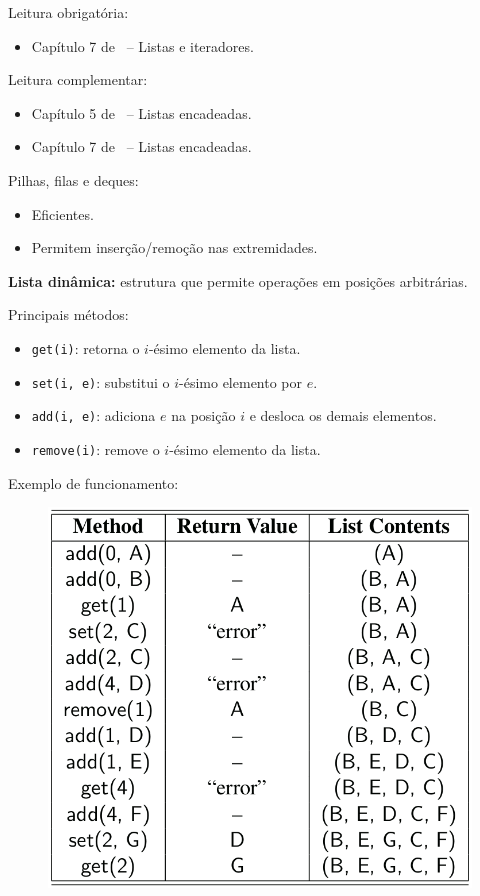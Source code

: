 \newcommand{\defs}{../defs}


\newcommand{\content}{Listas dinâmicas}
\newcommand{\class}{Algoritmos e Estruturas de Dados}
\newcommand{\shortcourse}{45EST}



\makeheader

{
Leitura obrigatória:
\begin{itemize}
	\item Capítulo 7 de~\cite{GoodrichEtAl2014} -- Listas e iteradores.
\end{itemize}

Leitura complementar:
\begin{itemize}
	\item Capítulo 5 de~\cite{Lafore2004} -- Listas encadeadas.
	\item Capítulo 7 de~\cite{Pereira2008} -- Listas encadeadas.
\end{itemize}
}

\medskip


Pilhas, filas e deques:
\begin{itemize}
	\item Eficientes. 
	\item Permitem inserção/remoção nas extremidades.
\end{itemize}

\textbf{Lista dinâmica:} estrutura que permite operações em posições arbitrárias.

\medskip

Principais métodos:
\begin{itemize}
	\item \texttt{get(i)}: retorna o $i$-ésimo elemento da lista.
	\item \texttt{set(i,\,e)}: substitui o $i$-ésimo elemento por $e$.
	\item \texttt{add(i,\,e)}: adiciona $e$ na posição $i$ e desloca os demais elementos.
	\item \texttt{remove(i)}: remove o $i$-ésimo elemento da lista.
\end{itemize}

\clearpage

Exemplo de funcionamento:

\begin{figure}[H]
	\centering
	\includegraphics[width=0.5\linewidth]{img/table-7-1}
\end{figure}

